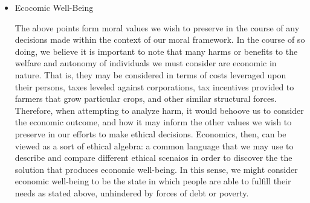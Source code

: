 \begin{itemize}
  \item Ecocomic Well-Being
    \begin{pointenv}
      The above points form moral values we wish to preserve in the 
      course of any decisions made within the context of our moral framework.  
      In the course of so doing, we believe it is important to note that 
      many harms or benefits to the welfare and autonomy of individuals 
      we must consider are economic in nature.  That is, they may be 
      considered in terms of costs leveraged upon their persons, taxes 
      leveled against corporations, tax incentives provided to 
      farmers that grow particular crops, and other similar structural 
      forces.  Therefore, when attempting to analyze harm, it would 
      behoove us to consider the economic outcome, and how it may inform 
      the other values we wish to preserve in our efforts to make 
      ethical decisions.  Economics, then, can be viewed as a sort of ethical 
      algebra: a common language that we may use to describe and 
      compare different ethical scenaios in order to discover the 
      the solution that produces economic well-being.  In this sense, we 
      might consider economic well-being to be the state in which people are able to fulfill 
      their needs as stated above, unhindered by forces of debt or 
      poverty.  
    \end{pointenv}
\end{itemize}


